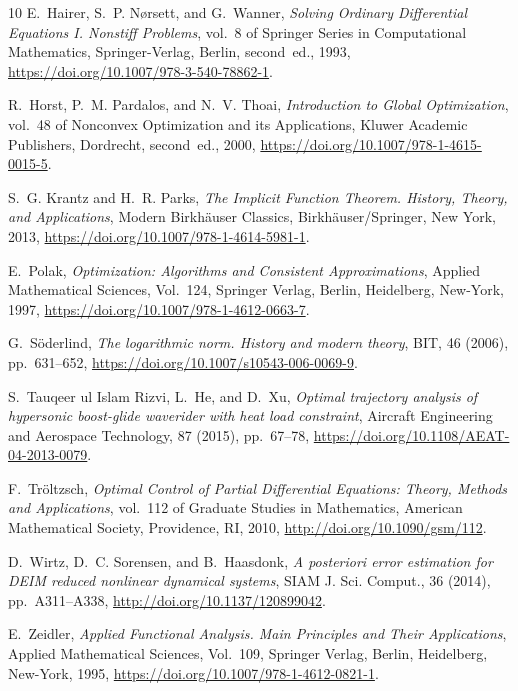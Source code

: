 \documentclass[onefignum,onetabnum]{siamart220329}
\numberwithin{equation}{section}
\begin{document}
\begin{thebibliography}{10}
{\sc E.~Hairer, S.~P. N{\o}rsett, and G.~Wanner}, {\em Solving Ordinary
  Differential Equations {I}. Nonstiff Problems}, vol.~8 of Springer Series in
  Computational Mathematics, Springer-Verlag, Berlin, second~ed., 1993,
  \url{https://doi.org/10.1007/978-3-540-78862-1}.

{\sc R.~Horst, P.~M. Pardalos, and N.~V. Thoai}, {\em Introduction to Global
  Optimization}, vol.~48 of Nonconvex Optimization and its Applications, Kluwer
  Academic Publishers, Dordrecht, second~ed., 2000,
  \url{https://doi.org/10.1007/978-1-4615-0015-5}.

{\sc S.~G. Krantz and H.~R. Parks}, {\em The Implicit Function Theorem.
  {H}istory, Theory, and Applications}, Modern Birkh\"{a}user Classics,
  Birkh\"{a}user/Springer, New York, 2013,
  \url{https://doi.org/10.1007/978-1-4614-5981-1}.

{\sc E.~Polak}, {\em Optimization: {A}lgorithms and Consistent Approximations},
  Applied Mathematical Sciences, Vol.~124, Springer Verlag, Berlin, Heidelberg,
  New-York, 1997, \url{https://doi.org/10.1007/978-1-4612-0663-7}.

{\sc G.~S{\"o}derlind}, {\em The logarithmic norm. {H}istory and modern
  theory}, BIT, 46 (2006), pp.~631--652,
  \url{https://doi.org/10.1007/s10543-006-0069-9}.

{\sc S.~{Tauqeer ul Islam Rizvi}, L.~He, and D.~Xu}, {\em Optimal trajectory
  analysis of hypersonic boost-glide waverider with heat load constraint},
  Aircraft Engineering and Aerospace Technology, 87 (2015), pp.~67--78,
  \url{https://doi.org/10.1108/AEAT-04-2013-0079}.

{\sc F.~Tr{\"o}ltzsch}, {\em Optimal Control of Partial Differential Equations:
  {T}heory, Methods and Applications}, vol.~112 of Graduate Studies in
  Mathematics, American Mathematical Society, Providence, RI, 2010,
  \url{http://doi.org/10.1090/gsm/112}.

{\sc D.~Wirtz, D.~C. Sorensen, and B.~Haasdonk}, {\em A posteriori error
  estimation for {DEIM} reduced nonlinear dynamical systems}, SIAM J. Sci.
  Comput., 36 (2014), pp.~A311--A338, 
  \url{http://doi.org/10.1137/120899042}.

{\sc E.~Zeidler}, {\em Applied Functional Analysis. Main Principles and Their
  Applications}, Applied Mathematical Sciences, Vol.~109, Springer Verlag,
  Berlin, Heidelberg, New-York, 1995,
  \url{https://doi.org/10.1007/978-1-4612-0821-1}.

\end{thebibliography}
\end{document}
